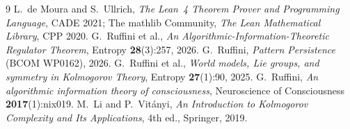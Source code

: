 \documentclass[11pt,a4paper]{article}
\begin{document}
\begin{thebibliography}{9}
 L.\ de Moura and S.\ Ullrich, \emph{The Lean~4 Theorem Prover and
Programming Language}, CADE 2021; The mathlib Community, \emph{The Lean Mathematical Library},
CPP 2020.
 G.\ Ruffini et al., \emph{An Algorithmic-Information-Theoretic Regulator
Theorem}, Entropy \textbf{28}(3):257, 2026.
 G.\ Ruffini, \emph{Pattern Persistence} (BCOM WP0162), 2026.
 G.\ Ruffini et al., \emph{World models, Lie groups, and symmetry
in Kolmogorov Theory}, Entropy \textbf{27}(1):90, 2025.
 G.\ Ruffini, \emph{An algorithmic information theory of
consciousness}, Neuroscience of Consciousness \textbf{2017}(1):nix019.
 M.\ Li and P.\ Vit\'anyi, \emph{An Introduction to Kolmogorov Complexity and
Its Applications}, 4th ed., Springer, 2019.
\end{thebibliography}
\end{document}
